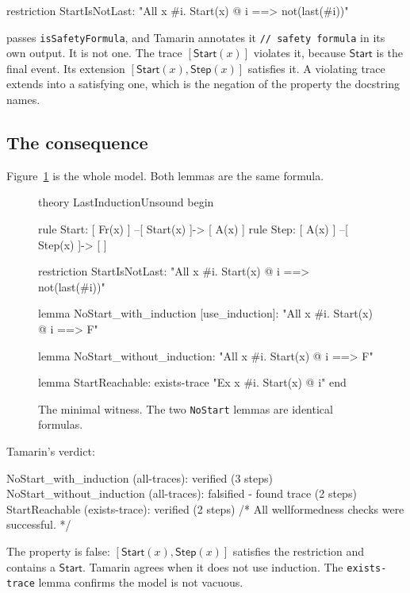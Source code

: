 \documentclass[version=preprint]{iacrcc}
\newcommand{\code}[1]{\texttt{\small #1}}
\theoremstyle{definition}
\theoremstyle{remark}
\begin{document}
\begin{tmlisting}
	restriction StartIsNotLast:
	"All x #i. Start(x) @ i ==> not(last(#i))"
\end{tmlisting}

passes \code{isSafetyFormula}, and Tamarin annotates it \code{// safety
	formula} in its own output. It is not one. The trace $[\mathsf{Start}(x)]$
violates it, because $\mathsf{Start}$ is the final event. Its extension
$[\mathsf{Start}(x), \mathsf{Step}(x)]$ satisfies it. A violating trace extends
into a satisfying one, which is the negation of the property the docstring
names.

\subsection{The consequence}

Figure~\ref{fig:poc01} is the whole model. Both lemmas are the same formula.

\begin{figure}[t]
	\begin{tmlisting}
		theory LastInductionUnsound begin

		rule Start: [ Fr(x) ] --[ Start(x) ]-> [ A(x) ]
		rule Step:  [ A(x)  ] --[ Step(x)  ]-> [      ]

		restriction StartIsNotLast:
		"All x #i. Start(x) @ i ==> not(last(#i))"

		lemma NoStart_with_induction [use_induction]:
		"All x #i. Start(x) @ i ==> F"

		lemma NoStart_without_induction:
		"All x #i. Start(x) @ i ==> F"

		lemma StartReachable: exists-trace
		"Ex x #i. Start(x) @ i"
		end
	\end{tmlisting}
	\caption{The minimal witness. The two \code{NoStart} lemmas are identical
		formulas.}\label{fig:poc01}
\end{figure}

Tamarin's verdict:

\begin{outlisting}
	NoStart_with_induction    (all-traces): verified (3 steps)
	NoStart_without_induction (all-traces): falsified - found trace (2 steps)
	StartReachable            (exists-trace): verified (2 steps)
	/* All wellformedness checks were successful. */
\end{outlisting}

The property is false: $[\mathsf{Start}(x), \mathsf{Step}(x)]$ satisfies the
restriction and contains a $\mathsf{Start}$. Tamarin agrees when it does not use
induction. The \code{exists-trace} lemma confirms the model is not vacuous.
\end{document}
